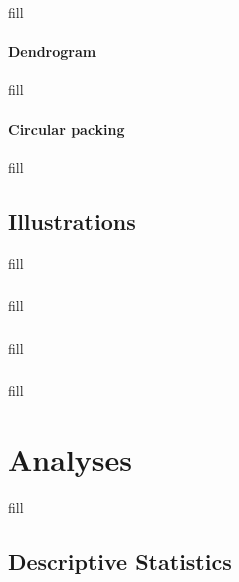 \documentclass[
  b5paper]{book}
\begin{document}
fill

\hypertarget{dendrogram}{%
\subsubsection*{Dendrogram}\label{dendrogram}}

fill

\hypertarget{circular-packing}{%
\subsubsection*{Circular packing}\label{circular-packing}}

fill

\hypertarget{illustrations}{%
\section{Illustrations}\label{illustrations}}

fill

\hypertarget{section-1}{%
\subsection*{}\label{section-1}}

fill

\hypertarget{section-2}{%
\subsection*{}\label{section-2}}

fill

\hypertarget{section-3}{%
\subsection*{}\label{section-3}}

fill

\hypertarget{analyses-1}{%
\chapter{Analyses}\label{analyses-1}}

fill

\hypertarget{descriptive-statistics}{%
\section{Descriptive Statistics}\label{descriptive-statistics}}
\end{document}
